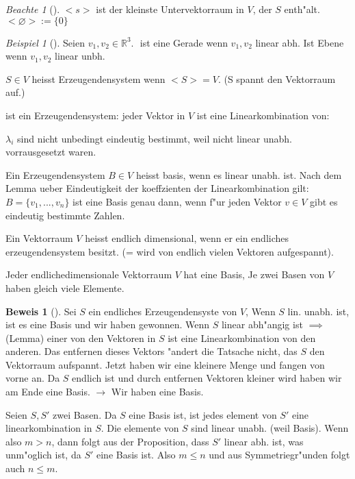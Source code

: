 \documentclass[11pt]{article}
\theoremstyle{remark}
\newtheorem{exa}{Beispiel}[section]
\newtheorem*{notte}{Beachte}
\theoremstyle{definition}
\newtheorem{prof}{Beweis}
\theoremstyle{remark}
\begin{document}
\begin{notte}[] \label{}
\(<s>\) ist der kleinste Untervektorraum in \(V\), der \(S\) enth"alt. 
\(<\varnothing >:=\{0\}\)
\end{notte}

\begin{exa}[] \label{}
Seien \(v_1, v_2 \in \mathbb{R}^3\).
\(<v1,v2>\) ist eine Gerade wenn \(v_1,v_2\) linear abh. Ist Ebene wenn \(v_1,v_2\)
linear unbh.
\end{exa}

\begin{definition}{}{}
\(S\in V\) heisst Erzeugendensystem wenn \(<S>=V\). (S spannt den Vektorraum auf.)

ist ein Erzeugendensystem: jeder Vektor in \(V\) ist eine Linearkombination von:

\(\lambda_i\) sind nicht unbedingt eindeutig bestimmt, weil nicht linear unabh.
vorrausgesetzt waren.
\end{definition}

\begin{definition}{}{}
Ein Erzeugendensystem \(B\in V\) heisst basis, wenn es linear unabh. ist. Nach dem
Lemma ueber Eindeutigkeit der koeffzienten der Linearkombination gilt: \(B=\{v_1,
..., v_n\}\) ist eine Basis genau dann, wenn f"ur jeden Vektor \(v \in V\) gibt es
 eindeutig bestimmte Zahlen.
\end{definition}

\begin{definition}{}{}
Ein Vektorraum \(V\) heisst endlich dimensional, wenn er ein endliches
erzeugendensystem besitzt. (= wird von endlich vielen Vektoren aufgespannt).
\end{definition}

\begin{theo}{}{}
Jeder endlichedimensionale Vektorraum \(V\)  hat eine Basis, Je zwei Basen von \(V\)
haben gleich viele Elemente.
\end{theo}

\begin{prof}[] \label{}
Sei \(S\) ein endliches Erzeugendensyste von \(V\), Wenn \(S\) lin. unabh. ist, ist es
eine Basis und wir haben gewonnen. Wenn \(S\) linear abh"angig ist $\implies$
(Lemma) einer von den Vektoren in \(S\) ist eine Linearkombination von den
anderen. Das entfernen dieses Vektors "andert die Tatsache nicht, das \(S\) den
Vektorraum aufspannt. Jetzt haben wir eine kleinere Menge und fangen von vorne
an. Da \(S\) endlich ist und durch entfernen Vektoren kleiner wird haben wir am
Ende eine Basis.
\(\rightarrow\) Wir haben eine Basis.

Seien \(S, S'\) zwei Basen. Da \(S\) eine Basis ist, ist jedes element von \(S'\) eine
linearkombination in \(S\). Die elemente von \(S\) sind linear unabh. (weil Basis).
Wenn also \(m>n\), dann folgt aus der Proposition, dass \(S'\) linear abh. ist, was
unm"oglich ist, da \(S'\) eine Basis ist. Also \(m \leq n\) und aus Symmetriegr"unden folgt auch \(n \leq m\).
\end{prof}
\end{document}
